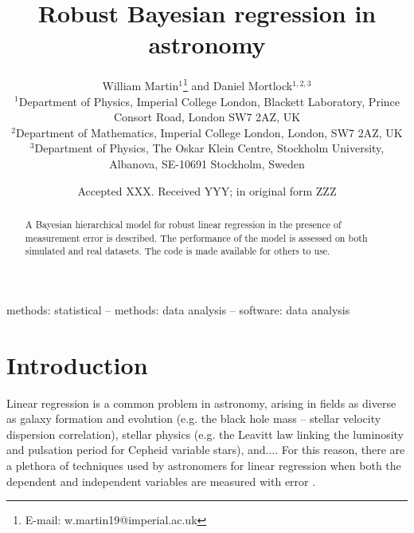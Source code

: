\documentclass[fleqn,usenatbib]{mnras}
\title[Robust regression in astronomy]{Robust Bayesian regression in astronomy}
\author[W. Martin \& D. Mortlock]{
William Martin$^{1}$\thanks{E-mail: w.martin19@imperial.ac.uk}
and Daniel Mortlock$^{1,2,3}$
\\
$^{1}$Department of Physics, Imperial College London, Blackett Laboratory, Prince Consort Road, London SW7 2AZ, UK\\
$^{2}$Department of Mathematics, Imperial College London, London, SW7 2AZ, UK\\
$^{3}$Department of Physics, The Oskar Klein Centre, Stockholm University, Albanova, SE-10691 Stockholm, Sweden
}
\date{Accepted XXX. Received YYY; in original form ZZZ}
\begin{document}
\label{firstpage}
\pagerange{\pageref{firstpage}--\pageref{lastpage}}
\maketitle

\begin{abstract}
A Bayesian hierarchical model for robust linear regression in the presence of measurement error is described.
The performance of the model is assessed on both simulated and real datasets.
The code is made available for others to use.
\end{abstract}

\begin{keywords}
methods: statistical -- methods: data analysis -- software: data analysis
\end{keywords}



\section{Introduction}
\label{sec:intro}









Linear regression is a common problem in astronomy, arising in fields as
diverse as {\color{red} galaxy formation and evolution (e.g. the black hole
mass -- stellar velocity dispersion correlation), stellar physics (e.g. the
Leavitt law linking the luminosity and pulsation period for Cepheid variable
stars), and...}. For this reason, there are a plethora of techniques used by
astronomers for linear regression when both the dependent and independent
variables are measured with error \citep[e.g.][]{Press:1992, Akritas:1996,
Tremaine:2002, Kelly:2007}.
\end{document}
